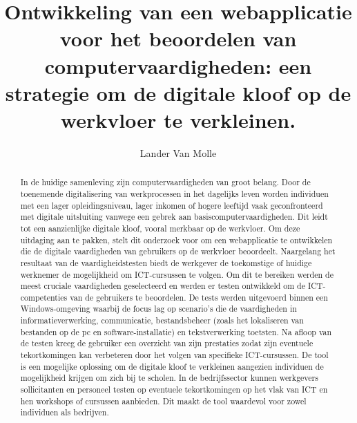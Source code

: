 \documentclass{hogent-article}
\title{Ontwikkeling van een webapplicatie voor het beoordelen van computervaardigheden: een strategie om de digitale kloof op de werkvloer te verkleinen.}
\author{Lander {Van Molle}}
\begin{document}
\begin{abstract}
  In de huidige samenleving zijn computervaardigheden van groot belang. Door de toenemende digitalisering van werkprocessen in het dagelijks leven worden individuen met een lager opleidingsniveau, lager inkomen of hogere leeftijd vaak geconfronteerd met digitale uitsluiting vanwege een gebrek aan basiscomputervaardigheden. Dit leidt tot een aanzienlijke digitale kloof, vooral merkbaar op de werkvloer.
  Om deze uitdaging aan te pakken, stelt dit onderzoek voor om een webapplicatie te ontwikkelen die de digitale vaardigheden van gebruikers op de werkvloer beoordeelt. Naargelang het resultaat van de vaardigheidstesten biedt de werkgever de toekomstige of huidige werknemer de mogelijkheid om ICT-cursussen te volgen. Om dit te bereiken werden de meest cruciale vaardigheden geselecteerd en werden er testen ontwikkeld om de ICT-competenties van de gebruikers te beoordelen.
  De tests werden uitgevoerd binnen een Windows-omgeving waarbij de focus lag op scenario's die de vaardigheden in informatieverwerking, communicatie, bestandsbeheer (zoals het lokaliseren van bestanden op de pc en software-installatie) en tekstverwerking toetsten. Na afloop van de testen kreeg de gebruiker een overzicht van zijn prestaties zodat zijn eventuele tekortkomingen kan verbeteren door het volgen van specifieke ICT-cursussen. De tool is een mogelijke oplossing om de digitale kloof te verkleinen aangezien individuen de mogelijkheid krijgen om zich bij te scholen.
  In de bedrijfssector kunnen werkgevers sollicitanten en personeel testen op eventuele tekortkomingen op het vlak van ICT en hen workshops of cursussen aanbieden. Dit maakt de tool waardevol voor zowel individuen als bedrijven.
\end{abstract}

\tableofcontents



\printbibliography[heading=bibintoc]
\end{document}
